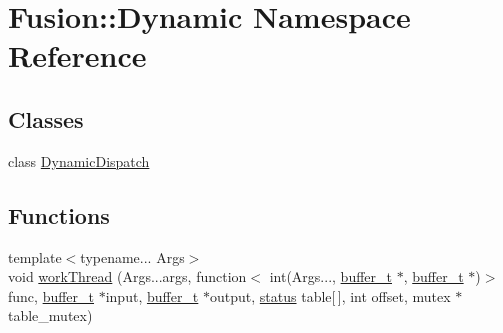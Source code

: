 \hypertarget{namespace_fusion_1_1_dynamic}{\section{Fusion\-:\-:Dynamic Namespace Reference}
\label{namespace_fusion_1_1_dynamic}
}
\subsection*{Classes}
\begin{DoxyCompactItemize}
\item 
class \hyperlink{class_fusion_1_1_dynamic_1_1_dynamic_dispatch}{Dynamic\-Dispatch}
\end{DoxyCompactItemize}
\subsection*{Functions}
\begin{DoxyCompactItemize}
\item 
{\footnotesize template$<$typename... Args$>$ }\\void \hyperlink{namespace_fusion_1_1_dynamic_a152d31c37efe7c83af9d8f899fe80f3e}{work\-Thread} (Args...\-args, function$<$ int(Args..., \hyperlink{structbuffer__t}{buffer\-\_\-t} $\ast$, \hyperlink{structbuffer__t}{buffer\-\_\-t} $\ast$)$>$ func, \hyperlink{structbuffer__t}{buffer\-\_\-t} $\ast$input, \hyperlink{structbuffer__t}{buffer\-\_\-t} $\ast$output, \hyperlink{fusion__info_8h_a015eb90e0de9f16e87bd149d4b9ce959}{status} table\mbox{[}$\,$\mbox{]}, int offset, mutex $\ast$table\-\_\-mutex)
\end{DoxyCompactItemize}


